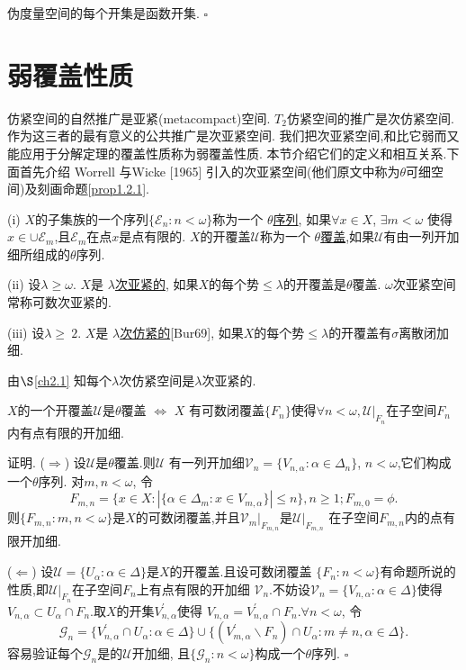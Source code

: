 \documentclass[main.tex]{subfiles}
\begin{document}
\begin{fact}
伪度量空间的每个开集是函数开集. $\square$
\end{fact}

\section{弱覆盖性质}\label{ch1.2}
仿紧空间的自然推广是亚紧(metacompact)空间.
$T_2$仿紧空间的推广是次仿紧空间.
作为这三者的最有意义的公共推广是次亚紧空间.
我们把次亚紧空间,和比它弱而又能应用于分解定理的覆盖性质称为弱覆盖性质.
本节介绍它们的定义和相互关系.下面首先介绍 Worrell 与Wicke [1965] 引入的次亚紧空间(他们原文中称为$\theta$可细空间)及刻画命题\ref{prop1.2.1}.


\begin{definition}
\textnormal{(i)} $X$的子集族的一个序列$\{\mathscr{E}_n:n<\omega\}$称为一个
\underline{$\theta$序列},
如果$\forall x\in X$, $ \exists m < \omega$ 使得$x\in\cup \mathscr{E}_m$,且$\mathscr{E}_m$在点$x$是点有限的.
$X$的开覆盖$\mathscr{U}$称为一个 \underline{$\theta$覆盖},如果$\mathscr{U}$有由一列开加细所组成的$\theta$序列.

\textnormal{(ii)} 设$\lambda\ge\omega$. $X$是 \underline{$\lambda$次亚紧的},
如果$X$的每个势$\le\lambda$的开覆盖是$\theta$覆盖.
$\omega$次亚紧空间常称可数次亚紧的.


\textnormal{(iii)} 设$\lambda\ge\ 2$. $X$是 \underline{$\lambda$次仿紧的}\textnormal{[Bur69]},
如果$X$的每个势$\le\lambda$的开覆盖有$\sigma$离散闭加细.
\end{definition}

由$\S$\ref{ch2.1} 知每个$\lambda$次仿紧空间是$\lambda$次亚紧的.

\begin{proposition}\label{prop1.2.1}
$X$的一个开覆盖$\mathscr{U}$是$\theta$覆盖 $\Leftrightarrow$
$X$ 有可数闭覆盖$\{F_n\}$使得$\forall n < \omega, \mathscr{U}|_{F_n}$在子空间${F_n}$内有点有限的开加细.
\end{proposition}

证明. ($\Rightarrow$) 设$\mathscr{U}$是$\theta$覆盖.则$\mathscr{U}$
有一列开加细$\mathscr{V}_n = \{V_{n, \alpha}: \alpha\in \Delta_n\}$,
$n<\omega$,它们构成一个$\theta$序列.
对$m,n<\omega$, 令
$$F_{m,n}=\{x\in X: |\{\alpha\in\Delta_m: x\in V_{m,\alpha}\}|\le n\}, n\ge 1; F_{m,0} = \phi.$$
则$\{F_{m,n}:m,n<\omega\}$是$X$的可数闭覆盖,并且$\mathscr{V}_m|_{F_{m,n}}$是$\mathscr{U}|_{F_{m,n}}$
在子空间$F_{m,n}$内的点有限开加细.

($\Leftarrow$) 设$\mathscr{U} = \{ U_\alpha: \alpha\in\Delta\}$是$X$的开覆盖.且设可数闭覆盖
$\{F_n:n<\omega\}$有命题所说的性质,即$\mathscr{U}|_{F_n}$在子空间$F_n$上有点有限的开加细
$\mathscr{V}_n$.不妨设$\mathscr{V}_n=\{V_{n,\alpha}:\alpha\in\Delta\}$使得
$V_{n,\alpha}\subset U_\alpha\cap F_n$.取$X$的开集$V_{n,\alpha}^\prime$使得
$V_{n,\alpha}=V_{n,\alpha}^\prime\cap F_n$.$\forall n<\omega$, 令
$$\mathscr{G}_n=\{V_{n,\alpha}^\prime\cap U_\alpha:\alpha\in\Delta\}
\cup\{(V_{m,\alpha}^\prime\backslash F_n)\cap U_\alpha: m\ne n, \alpha\in\Delta\}.$$
容易验证每个$\mathscr{G}_n$是的$\mathscr{U}$开加细,
且$\{\mathscr{G}_n:n<\omega\}$构成一个$\theta$序列.  $\square$
\end{document}
